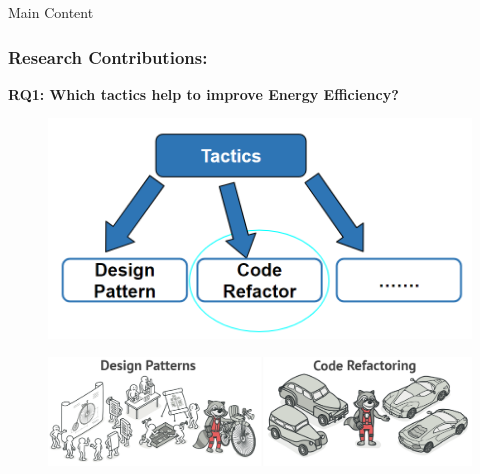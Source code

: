 \documentclass{beamer}
\begin{document}
\begin{frame}{Main Content}
  \frametitle{Research Contributions:}
  \textbf{\footnotesize RQ1: Which tactics help to improve Energy Efficiency?}
  
  \begin{figure}
    \centering
    \includegraphics[width=.6\textwidth]{figures/Slide_12(Tactics to improve energy efficiency).png}
 \end{figure}
 
 \begin{figure}
    \centering
    \includegraphics[width=1\textwidth]{figures/Slide_12(Code refactoring and design pattern).png}
 \end{figure}
  
\end{frame}
\end{document}
